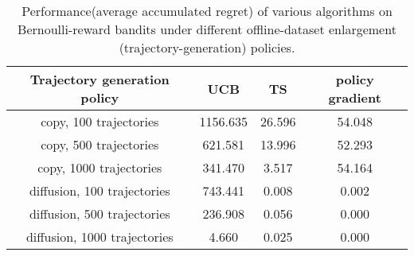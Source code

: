 \begin{table}[htbp]
    \centering
    \begin{tabular}{c c c c}
    \toprule
    Trajectory generation policy & UCB & TS & policy gradient \\
    \midrule
    copy, 100 trajectories& 1156.635 & 26.596 & 54.048 \\
    copy, 500 trajectories& 621.581 & 13.996 & 52.293 \\
    copy, 1000 trajectories & 341.470 & 3.517 & 54.164 \\
    diffusion, 100 trajectories & 743.441 & 0.008 & 0.002 \\
    diffusion, 500 trajectories & 236.908 & 0.056 & 0.000 \\
    diffusion, 1000 trajectories & 4.660 & 0.025 & 0.000 \\
    \bottomrule
\end{tabular}
\caption{Performance(average accumulated regret) of various algorithms on Bernoulli-reward bandits under different offline-dataset enlargement (trajectory-generation) policies.}
\label{table:stochastic_bandit_num}
\end{table}